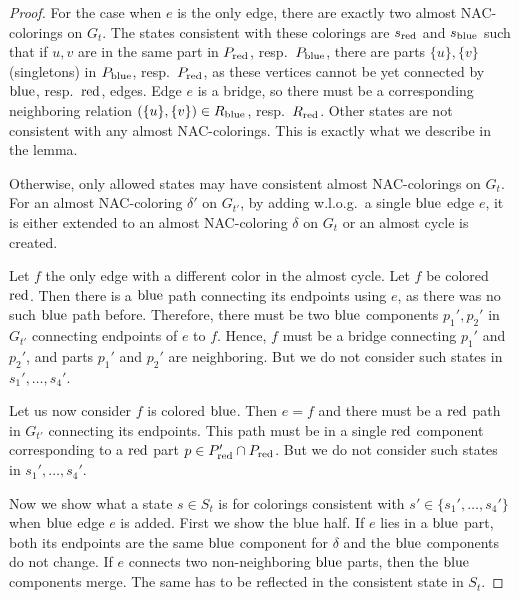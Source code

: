\begin{proof}
	For the case when \( e \) is the only edge,
	there are exactly two almost NAC-colorings on \( G_t \).
	The states consistent with these colorings are \( s_{\text{red}} \) and \( s_{\text{blue}} \)
	such that if \( u, v \) are in the same part in \( P_{\text{red}} \), resp.\ \( P_{\text{blue}} \),
	there are parts \( \{u\}, \{v\} \) (singletons) in \( P_{\text{blue}} \), resp.\ \( P_{\text{red}} \),
	as these vertices cannot be yet connected by \( \text{blue} \), resp.\ \( \text{red} \), edges.
	Edge \( e \) is a bridge, so there must be a corresponding neighboring
	relation \( (\{u\}, \{v\}) \in R_{\text{blue}} \), resp.\ \( R_{\text{red}} \).
	Other states are not consistent with any almost NAC-colorings.
	This is exactly what we describe in the lemma.

	Otherwise, only allowed states may have consistent almost NAC-colorings on \( G_t \).
	For an almost NAC-coloring \( \delta' \) on \( G_{t'} \),
	by adding w.l.o.g.\ a single \( \text{blue} \) edge \( e \),
	it is either extended to an almost NAC-coloring \( \delta \) on \( G_t \)
	or an almost cycle is created.

	Let \( f \) the only edge with a different color in the almost cycle.
	Let \( f \) be colored \( \text{red} \).
	Then there is a \( \text{blue} \) path connecting its endpoints using \( e \),
	as there was no such \( \text{blue} \) path before.
	Therefore, there must be two \( \text{blue} \) components \( p_1', p_2' \) in \( G_{t'} \)
	connecting endpoints of \( e \) to \( f \).
	Hence, \( f \) must be a bridge connecting \( p_1' \) and \( p_2' \),
	and parts \( p_1' \) and \( p_2' \) are neighboring.
	But we do not consider such states in \( s_1', \dots, s_4' \).

	Let us now consider \( f \) is colored \( \text{blue} \).
	Then \( e = f \) and
	there must be a \( \text{red} \) path in \( G_{t'} \) connecting its endpoints.
	This path must be in a single \( \text{red} \) component corresponding
	to a \( \text{red} \) part \( p \in P_{\text{red}}' \cap P_{\text{red}} \).
	But we do not consider such states in \( s_1', \dots, s_4' \).

	Now we show what a state \( s \in S_t \) is
	for colorings consistent with \( s' \in \{s_1', \dots, s_4'\} \)
	when \( \text{blue} \) edge \( e \) is added.
	First we show the blue half.
	If \( e \) lies in a \( \text{blue} \) part,
	both its endpoints are the same \( \text{blue} \) component
	for \( \delta \) and the \( \text{blue} \) components do not change.
	If \( e \) connects two non-neighboring \( \text{blue} \) parts,
	then the \( \text{blue} \) components merge. The same has to be reflected in
	the consistent state in \( S_t \).


\end{proof}
